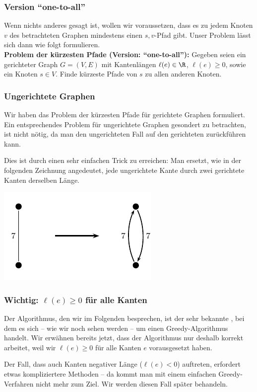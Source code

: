 \documentclass[smaller]{beamer}
\begin{document}
\begin{frame}
\frametitle{Version \enquote{one-to-all}}
Wenn nichts anderes gesagt ist, wollen wir voraussetzen, dass es zu jedem Knoten $v$ des betrachteten Graphen mindestens einen $s,v$-Pfad gibt. Unser Problem lässt sich dann wie folgt formulieren. \\ \vspace*{0.2cm}
\textbf{Problem der kürzesten Pfade (Version: \enquote{one-to-all}):}
Gegeben seien ein gerichteter Graph $G=(V,E)$ mit Kantenlängen $\ell(e) \in \R$, $\ell(e) \geq 0$, sowie ein Knoten $s \in V$. Finde kürzeste Pfade von $s$ zu allen anderen Knoten. 
\end{frame}

\begin{frame}
\frametitle{Ungerichtete Graphen}
Wir haben das Problem der kürzesten Pfade für \alert{gerichtete} Graphen formuliert. Ein entsprechendes Problem für ungerichtete Graphen gesondert zu betrachten, ist nicht nötig, da man den ungerichteten Fall auf den gerichteten zurückführen kann. \\ \vspace*{0.2cm}

\alert{Dies ist durch einen sehr einfachen Trick zu erreichen: Man ersetzt, wie in der folgenden Zeichnung angedeutet, jede ungerichtete Kante durch zwei gerichtete Kanten derselben Länge.}

\begin{center}
\includegraphics{fig75.pdf}
\end{center}
\end{frame}

\begin{frame}
\frametitle{Wichtig: $\ell(e) \ge 0$ für alle Kanten}
Der Algorithmus, den wir im Folgenden besprechen, ist der sehr bekannte , bei dem es sich -- wie wir noch sehen werden -- um einen Greedy-Algorithmus handelt. Wir erwähnen bereits jetzt, dass der Algorithmus nur deshalb korrekt arbeitet, \alert{weil wir $\ell(e) \geq 0$ für alle Kanten $e$ vorausgesetzt haben.} \\ \vspace*{0.2cm}

Der Fall, dass auch Kanten negativer Länge ($\ell(e) < 0$) auftreten, erfordert etwas kompliziertere Methoden -- da kommt man mit einem einfachen Greedy-Verfahren nicht mehr zum Ziel. Wir werden diesen Fall später behandeln.
\end{frame}
\end{document}
